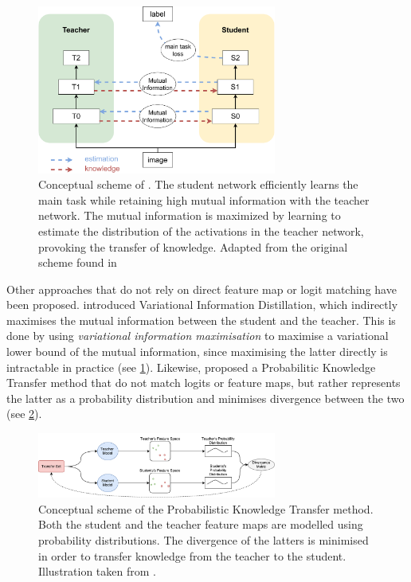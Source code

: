\begin{figure}[htbp]
    \centering
    \includegraphics[width=0.7\textwidth]{chapter_sota/assets/variational_info_distillation.pdf}
    \caption{Conceptual scheme of \cite{DBLP:conf/cvpr/AhnHDLD19}. The student
    network efficiently learns the main task while retaining high mutual information
    with the teacher network. The mutual information is maximized by learning to
    estimate the distribution of the activations in the teacher network, provoking
    the transfer of knowledge. Adapted from the original
    scheme found in \cite{DBLP:conf/cvpr/AhnHDLD19}}
    \label{fig:sota:vid_scheme}
\end{figure}

Other approaches that do not rely on direct feature map or logit matching have
been proposed. \cite{DBLP:conf/cvpr/AhnHDLD19} introduced Variational
Information Distillation, which indirectly maximises the mutual information
between the student and the teacher. This is done by using \emph{variational
information maximisation} \cite{barber2004algorithm} to maximise a variational
lower bound of the mutual information, since maximising the latter directly is
intractable in practice (see \cref{fig:sota:vid_scheme}). Likewise, \cite{DBLP:conf/eccv/PassalisT18} proposed a
Probabilitic Knowledge Transfer method that do not match logits or feature maps,
but rather represents the latter as a probability distribution and minimises
divergence between the two (see \cref{fig:sota:pkt_scheme}).\\


\begin{figure}[htbp]
    \centering
    \includegraphics[width=0.7\textwidth]{chapter_sota/assets/pkt_diagram.pdf}
    \caption{ Conceptual scheme of the
    Probabilistic Knowledge Transfer method. Both the student and the teacher
    feature maps are modelled using probability distributions. The divergence of the
    latters is minimised in order to transfer knowledge from the teacher to the
    student. Illustration taken from \cite{DBLP:conf/eccv/PassalisT18}.}
    \label{fig:sota:pkt_scheme}
\end{figure}

